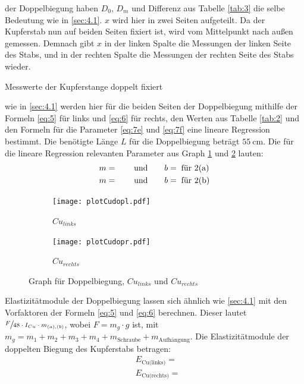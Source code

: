 \justifying der Doppelbiegung haben $D_0$, $D_m$ und Differenz aus Tabelle \ref{tab:3} die selbe Bedeutung wie in \ref{sec:4.1}.
$x$ wird hier in zwei Seiten aufgeteilt. Da der Kupferstab nun auf beiden Seiten fixiert ist, wird vom Mittelpunkt nach außen gemessen. Demnach
gibt $x$ in der linken Spalte die Messungen der linken Seite des Stabs, und in der rechten Spalte die Messungen der rechten Seite des Stabs wieder.
\begin{table}[H]
    \centering
    
    \caption{Messwerte der Kupferstange doppelt fixiert}
    \label{tab:3}
\end{table}

\justifying wie in \ref{sec:4.1} werden hier für die beiden Seiten der Doppelbiegung mithilfe der Formeln \eqref{eq:5} für
links und \eqref{eq:6} für rechts, den Werten aus Tabelle \ref{tab:2} und den Formeln für die Parameter \eqref{eq:7e} und \eqref{eq:7f} eine 
lineare Regression bestimmt. Die benötigte Länge $L$ für die Doppelbiegung beträgt $\SI{55}{\centi\meter}$. Die für die lineare Regression relevanten 
Parameter aus Graph \ref{fig:2a} und \ref{fig:2b} lauten:
\begin{subequations}\label{eq:16}
\begin{align}
    m &= \text{} \qquad \text{und} \qquad
    b = \text{}\label{eq:16a} \text{\;für 2(a)}\\
    m &= \text{} \qquad \text{und} \qquad
    b = \text{}\label{eq:16b} \text{\;für 2(b)}
\end{align}
\end{subequations}
\begin{figure}[H]
\begin{subfigure}{0.495\linewidth}
    \centering
    \texttt{[image: plotCudopl.pdf]}
    \caption{$Cu_{links}$}
    \label{fig:2a}
\end{subfigure}
\begin{subfigure}{0.495\linewidth}
    \centering
    \texttt{[image: plotCudopr.pdf]}
    \caption{$Cu_{rechts}$}
    \label{fig:2b}
\end{subfigure}
\caption{Graph für Doppelbiegung, $Cu_{links}$ und $Cu_{rechts}$}
\label{fig:2}
\end{figure}

\justifying Elastizitätmodule der Doppelbiegung lassen sich ähnlich wie \ref{sec:4.1} mit den Vorfaktoren der Formeln \eqref{eq:5} und \eqref{eq:6}
berechnen. Dieser lautet $\sfrac{F}{48 \cdot I_{Cu} \cdot m_{(a),(b)}}$, wobei $F = m_g\cdot g$ ist, mit $m_g = m_1 + m_2 + m_3 + m_4 + m_{\text{Schraube}}
+ m_{\text{Aufhängung}}$.
Die Elastizitätmodule der doppelten Biegung des Kupferstabs betragen:
\begin{align}
    &E_{\text{Cu(links)}} = \text{} \label{eq:17}\\
    &E_{\text{Cu(rechts)}} = \text{} \label{eq:18}
\end{align}


